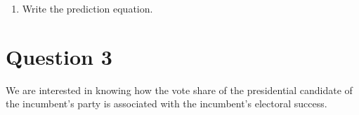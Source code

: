 \documentclass[12pt,letterpaper]{article}
\begin{document}
\begin{enumerate}
		\item Write the prediction equation.
			
			
		
	\end{enumerate}
	
	\newpage	
\section*{Question 3}

\noindent We are interested in knowing how the vote share of the presidential candidate of the incumbent's party is associated with the incumbent's electoral success.
	\vspace{.25cm}
\end{document}
